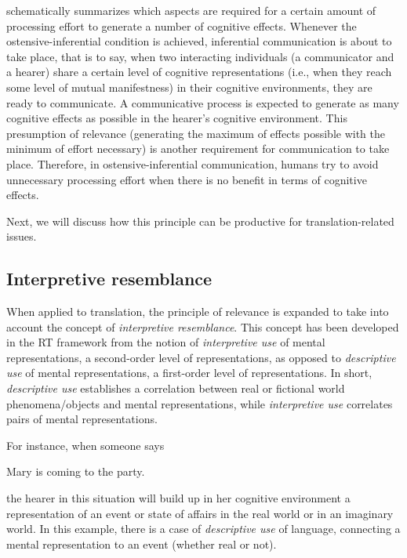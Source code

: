 \documentclass[output=paper]{langsci/langscibook}
\begin{document}
 schematically summarizes which aspects are required for a certain amount of processing effort to generate a number of cognitive effects. Whenever the ostensive-inferential condition is achieved, inferential communication is about to take place, that is to say, when two interacting individuals (a communicator and a hearer) share a certain level of cognitive representations (i.e., when they reach some level of mutual manifestness) in their cognitive environments, they are ready to communicate. A communicative process is expected to generate as many cognitive effects as possible in the hearer's cognitive environment. This presumption of relevance (generating the maximum of effects possible with the minimum of effort necessary) is another requirement for communication to take place. Therefore, in ostensive-inferential communication, humans try to avoid unnecessary processing effort when there is no benefit in terms of cognitive effects.



Next, we will discuss how this principle can be productive for translation-related issues.


\subsection{Interpretive resemblance\label{alves:sec:InterpretiveResemblance}}

When applied to translation, the principle of relevance is expanded to take into account the concept of \textit{interpretive resemblance}. This concept has been developed in the RT framework from the notion of \textit{interpretive use} of mental representations, a second-order level of representations, as opposed to \textit{descriptive use }of mental representations, a first-order level of representations. In short, \textit{descriptive use }establishes a correlation between real or fictional world phenomena/objects and mental representations, while \textit{interpretive use} correlates pairs of mental representations. 


For instance, when someone says 

\ea
Mary is coming to the party. \\
\z

the hearer in this situation will build up in her cognitive environment a representation of an event or state of affairs in the real world or in an imaginary world. In this example, there is a case of \textit{descriptive use} of language, connecting a mental representation to an event (whether real or not). 
\end{document}
